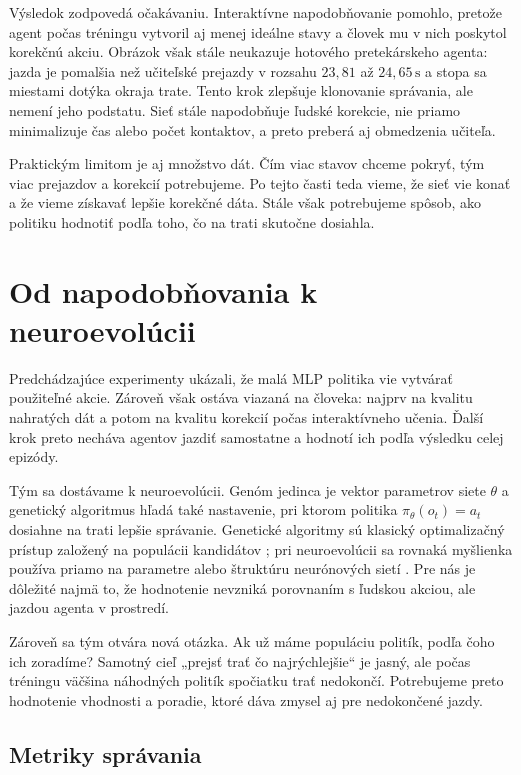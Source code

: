 Výsledok zodpovedá očakávaniu. Interaktívne napodobňovanie pomohlo, pretože agent počas tréningu vytvoril aj menej ideálne stavy a človek mu v nich poskytol korekčnú akciu. Obrázok však stále neukazuje hotového pretekárskeho agenta: jazda je pomalšia než učiteľské prejazdy v rozsahu \(23{,}81\) až \(24{,}65\,\mathrm{s}\) a stopa sa miestami dotýka okraja trate. Tento krok zlepšuje klonovanie správania, ale nemení jeho podstatu. Sieť stále napodobňuje ľudské korekcie, nie priamo minimalizuje čas alebo počet kontaktov, a preto preberá aj obmedzenia učiteľa.

Praktickým limitom je aj množstvo dát. Čím viac stavov chceme pokryť, tým viac prejazdov a korekcií potrebujeme. Po tejto časti teda vieme, že sieť vie konať a že vieme získavať lepšie korekčné dáta. Stále však potrebujeme spôsob, ako politiku hodnotiť podľa toho, čo na trati skutočne dosiahla.

\FloatBarrier

\section{Od napodobňovania k neuroevolúcii}

Predchádzajúce experimenty ukázali, že malá MLP politika vie vytvárať použiteľné akcie. Zároveň však ostáva viazaná na človeka: najprv na kvalitu nahratých dát a potom na kvalitu korekcií počas interaktívneho učenia. Ďalší krok preto necháva agentov jazdiť samostatne a hodnotí ich podľa výsledku celej epizódy.

Tým sa dostávame k neuroevolúcii. Genóm jedinca je vektor parametrov siete \(\theta\) a genetický algoritmus hľadá také nastavenie, pri ktorom politika \(\pi_\theta(o_t)=a_t\) dosiahne na trati lepšie správanie. Genetické algoritmy sú klasický optimalizačný prístup založený na populácii kandidátov \cite{goldberg1989ga}; pri neuroevolúcii sa rovnaká myšlienka používa priamo na parametre alebo štruktúru neurónových sietí \cite{stanley2002neat,yao1999_evolving_ann}. Pre nás je dôležité najmä to, že hodnotenie nevzniká porovnaním s ľudskou akciou, ale jazdou agenta v prostredí.

Zároveň sa tým otvára nová otázka. Ak už máme populáciu politík, podľa čoho ich zoradíme? Samotný cieľ „prejsť trať čo najrýchlejšie“ je jasný, ale počas tréningu väčšina náhodných politík spočiatku trať nedokončí. Potrebujeme preto hodnotenie vhodnosti a poradie, ktoré dáva zmysel aj pre nedokončené jazdy.

\subsection{Metriky správania}

